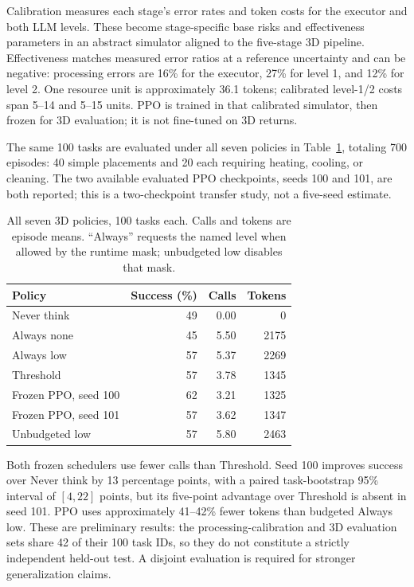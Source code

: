 \documentclass[conference]{IEEEtran}
\begin{document}
Calibration measures each stage's error rates and token costs for the executor and both LLM levels. These become stage-specific base risks and effectiveness parameters in an abstract simulator aligned to the five-stage 3D pipeline. Effectiveness matches measured error ratios at a reference uncertainty and can be negative: processing errors are 16\% for the executor, 27\% for level 1, and 12\% for level 2. One resource unit is approximately 36.1 tokens; calibrated level-1/2 costs span 5--14 and 5--15 units. PPO is trained in that calibrated simulator, then frozen for 3D evaluation; it is not fine-tuned on 3D returns.

The same 100 tasks are evaluated under all seven policies in Table~\ref{tab:3d}, totaling 700 episodes: 40 simple placements and 20 each requiring heating, cooling, or cleaning. The two available evaluated PPO checkpoints, seeds 100 and 101, are both reported; this is a two-checkpoint transfer study, not a five-seed estimate.

\begin{table}[t]
\centering
\caption{All seven 3D policies, 100 tasks each. Calls and tokens are episode means. ``Always'' requests the named level when allowed by the runtime mask; unbudgeted low disables that mask.}
\label{tab:3d}
\small
\begin{tabular}{@{}lrrr@{}}
\toprule
Policy&Success (\%)&Calls&Tokens\\
\midrule
Never think&49&0.00&0\\
Always none&45&5.50&2175\\
Always low&57&5.37&2269\\
Threshold&57&3.78&1345\\
Frozen PPO, seed 100&62&3.21&1325\\
Frozen PPO, seed 101&57&3.62&1347\\
Unbudgeted low&57&5.80&2463\\
\bottomrule
\end{tabular}
\end{table}

Both frozen schedulers use fewer calls than Threshold. Seed 100 improves success over Never think by 13 percentage points, with a paired task-bootstrap 95\% interval of $[4,22]$ points, but its five-point advantage over Threshold is absent in seed 101. PPO uses approximately 41--42\% fewer tokens than budgeted Always low. These are preliminary results: the processing-calibration and 3D evaluation sets share 42 of their 100 task IDs, so they do not constitute a strictly independent held-out test. A disjoint evaluation is required for stronger generalization claims.
\end{document}
